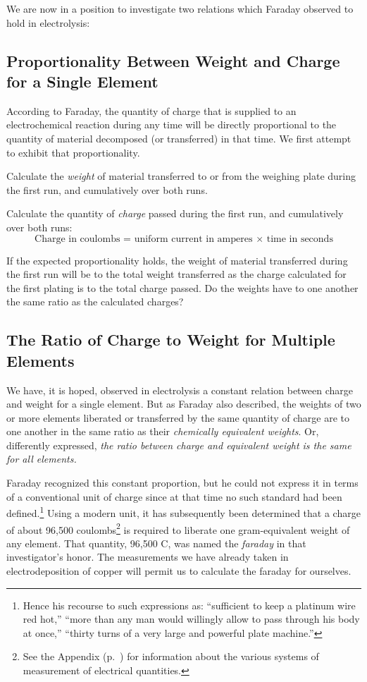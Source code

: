 We are now in a position to investigate two relations which Faraday
observed to hold in electrolysis:

\subsection{Proportionality Between Weight and Charge for a Single Element}

According to Faraday, the quantity of charge that is supplied to an
electrochemical reaction during any time will be directly proportional
to the quantity of material de\-com\-posed (or transferred) in that time. We
first attempt to exhibit that proportionality.

Calculate the \emph{weight} of material transferred to or from the
weighing plate during the first run, and cumulatively over both runs.

Calculate the quantity of \emph{charge} passed during the first run, and
cumulatively over both runs:
\begin{equation*}
\text{Charge in coulombs = uniform current in amperes $\times$ time in seconds}
\end{equation*}

If the expected proportionality holds, the weight of material
transferred during the first run will be to the total weight transferred
as the charge calculated for the first plating is to the total charge
passed. Do the weights have to one another the same ratio as the
calculated charges?

\subsection{The Ratio of Charge to Weight for Multiple Elements}

We have, it is hoped, observed in electrolysis a constant relation
between charge and weight for a single element. But as Faraday also
described, the weights of two or more elements liberated or transferred
by the same quantity of charge are to one another in the same ratio as
their \emph{chemically equivalent weights}. Or, differently expressed,
\emph{the ratio between charge and equivalent weight is the same for all
elements.}

Faraday recognized this constant proportion, but he could not express it
in terms of a conventional unit of charge since at that time no such
standard had been defined.\footnote{Hence his recourse to such
  expressions as: ``sufficient to keep a platinum wire red hot,'' ``more
  than any man would willingly allow to pass through his body at once,''
  ``thirty turns of a very large and powerful plate machine.''} Using a
modern unit, it has subsequently been determined that a charge of about
96,500 coulombs\footnote{See the Appendix (p.~\pageref{ch:appendix})
for information about the various systems of measurement of electrical quantities.} 
is required to liberate one gram-equivalent weight of any element. That
quantity, 96,500 C, was named the \emph{faraday} in that
investigator's honor. The mea\-sure\-ments we have already taken in
electrodeposition of copper will permit us to calculate the faraday for
ourselves.

